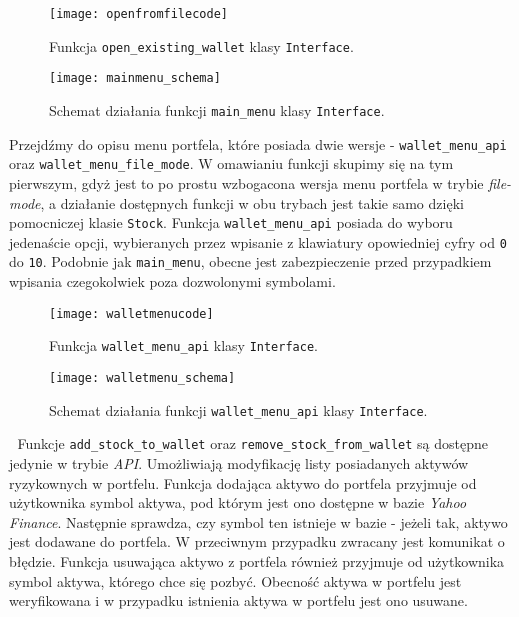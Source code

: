 \documentclass[magister]{dyplom}
\def\code#1{\texttt{#1}}
\begin{document}
\begin{figure}[ht!]
	\centering
	\texttt{[image: openfromfilecode]}
	\caption{Funkcja \code{open\_existing\_wallet} klasy \code{Interface}.}
\end{figure}

\begin{figure}[ht!]
	\centering
	\texttt{[image: mainmenu\_schema]}
	\caption{Schemat działania funkcji \code{main\_menu} klasy \code{Interface}.}
\end{figure}
\newpage
Przejdźmy do opisu menu portfela, które posiada dwie wersje - \code{wallet\_menu\_api} oraz \newline
\code{wallet\_menu\_file\_mode}. W omawianiu funkcji skupimy się na tym pierwszym, gdyż jest to po prostu wzbogacona wersja menu portfela w trybie \textit{file-mode}, a działanie dostępnych funkcji w obu trybach jest takie samo dzięki pomocniczej klasie \code{Stock}.
Funkcja \code{wallet\_menu\_api} posiada do wyboru jedenaście opcji, wybieranych przez wpisanie z klawiatury opowiedniej cyfry od \code{0} do \code{10}. Podobnie jak \code{main\_menu}, obecne jest zabezpieczenie przed przypadkiem wpisania czegokolwiek poza dozwolonymi symbolami. 

\begin{figure}[ht!]
	\centering
	\texttt{[image: walletmenucode]}
	\caption{Funkcja \code{wallet\_menu\_api} klasy \code{Interface}.}
\end{figure}

\begin{figure}[ht!]
	\centering
	\texttt{[image: walletmenu\_schema]}
	\caption{Schemat działania funkcji \code{wallet\_menu\_api} klasy \code{Interface}.}
\end{figure}
\newpage
\textcolor{white}{.}
\newpage
Funkcje \code{add\_stock\_to\_wallet} oraz \code{remove\_stock\_from\_wallet} są dostępne jedynie w trybie \textit{API}. Umożliwiają modyfikację listy posiadanych aktywów ryzykownych w portfelu. Funkcja dodająca aktywo do portfela przyjmuje od użytkownika symbol aktywa, pod którym jest ono dostępne w bazie \textit{Yahoo Finance}. Następnie sprawdza, czy symbol ten istnieje w bazie - jeżeli tak, aktywo jest dodawane do portfela. W przeciwnym przypadku zwracany jest komunikat o błędzie.
Funkcja usuwająca aktywo z portfela również przyjmuje od użytkownika symbol aktywa, którego chce się pozbyć. Obecność aktywa w portfelu jest weryfikowana i w przypadku istnienia aktywa w portfelu jest ono usuwane.
\end{document}
